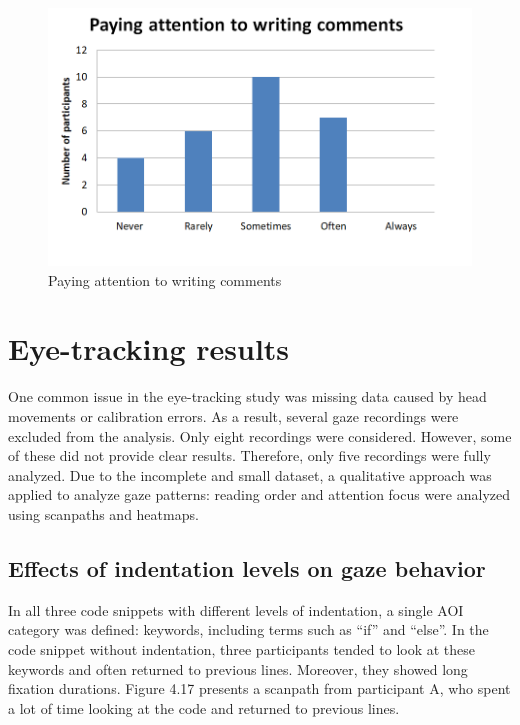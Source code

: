 \begin{figure} [H]
  \centering
  \includegraphics[scale=0.9]{figures/comAt.png}
  \caption{Paying attention to writing comments }
  \label{fig:AnhangsChor}
\end{figure}


\section{Eye-tracking results}
One common issue in the eye-tracking study was missing data caused by head movements or calibration errors. As a result, several gaze recordings were excluded from the analysis. Only eight recordings were considered. However, some of these did not provide clear results. Therefore, only five recordings were fully analyzed. 
Due to the incomplete and small dataset, a qualitative approach was applied to analyze gaze patterns: reading order and attention focus were analyzed using scanpaths and heatmaps.  
 


\subsection{Effects of indentation levels on gaze behavior}
In all three code snippets with different levels of indentation, a single AOI category was defined: keywords, including terms such as “if” and “else”. In the code snippet without indentation, three participants tended to look at these keywords and often returned to previous lines. Moreover, they showed long fixation durations.  Figure 4.17 presents a scanpath from participant A, who spent a lot of time looking at the code and returned to previous lines. 

